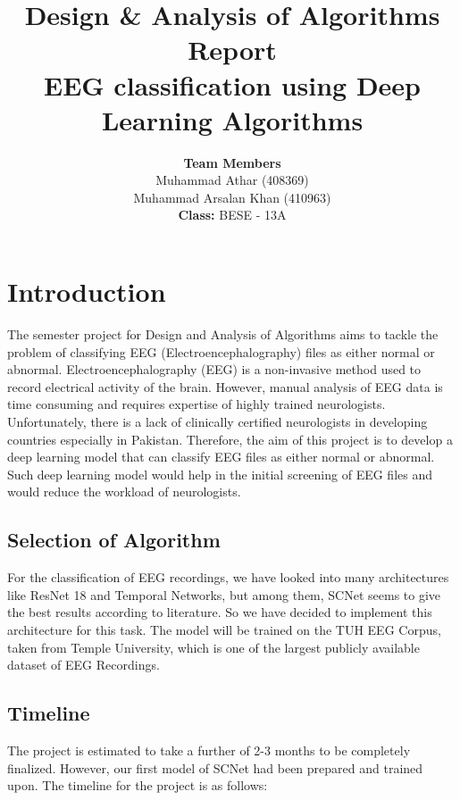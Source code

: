 \documentclass[10pt]{article}
\title{\textbf{Design \& Analysis of Algorithms Report \\ \vspace{5mm} EEG classification using Deep Learning Algorithms}}
\author{\textbf{Team Members} \vspace{1mm} \\ Muhammad Athar (408369) \\ Muhammad Arsalan Khan (410963) \vspace{5mm} \\ \textbf{Class: }BESE - 13A}
\begin{document}
\maketitle

\tableofcontents
\newpage

\justifying
\section{Introduction}
The semester project for Design and Analysis of Algorithms aims to tackle the problem of classifying EEG (Electroencephalography) files as either normal or abnormal.
Electroencephalography (EEG) is a non-invasive method used to record electrical activity of the brain. However, manual analysis of EEG data is time consuming and requires expertise of highly trained neurologists. Unfortunately, there is a lack of clinically certified neurologists in developing countries especially in Pakistan. Therefore, the aim of this project is to develop a deep learning model that can classify EEG files as either normal or abnormal. Such deep learning model would help in the initial screening of EEG files and would reduce the workload of neurologists.

\subsection{Selection of Algorithm}
For the classification of EEG recordings, we have looked into many architectures like ResNet 18 and Temporal Networks, but among them, SCNet seems to give the best results according to literature. So we have decided to implement this architecture for this task. The model will be trained on the TUH EEG Corpus, taken from Temple University, which is one of the largest publicly available dataset of EEG Recordings.

\subsection{Timeline}
The project is estimated to take a further of 2-3 months to be completely finalized. However, our first model of SCNet had been prepared and trained upon.
The timeline for the project is as follows:
\end{document}
